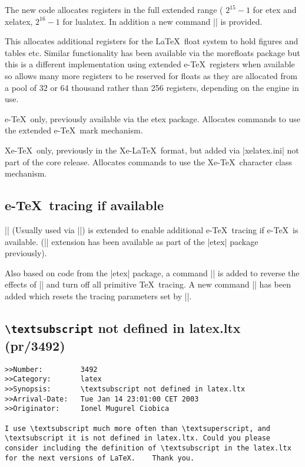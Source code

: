 \documentclass{ltxguide}
\newcommand\Lpack[1]{\mbox{\textsf{#1}}}
\newcommand\DescribeMacro[1]{\texttt{\string#1}}
\begin{document}
The new code allocates registers in the full extended range (
$2^{15}-1$ for etex and xelatex, $2^{16}-1$ for lualatex.
In addition a new command |\extrafloats| is provided.

\DescribeMacro{\extrafloats}
\smallskip

This allocates additional registers for the \LaTeX\ float system to
hold figures and tables etc. Similar functionality has been
available via the \Lpack{morefloats} package but this is a different
implementation using extended e-\TeX\ registers when available so
allows many more registers to be reserved for floats as they are
allocated from a pool of 32 or 64 thousand rather than 256 registers,
depending on the engine in use.

\DescribeMacro{\newmarks}
\smallskip

e-\TeX\ only, previously available via the \Lpack{etex} package.
Allocates commands to use the extended  e-\TeX\ mark mechanism.

\DescribeMacro{\newXeTeXintercharclass}
\smallskip

Xe-\TeX\ only, previously in the Xe-\LaTeX\ format, but added via
|xelatex.ini| not part of the core release. 
Allocates commands to use the Xe-\TeX\ character class mechanism.


\subsection{e-\TeX\ tracing if available}
|\loggingall| (Usually used via |\tracingall|) is extended to enable
additional e-\TeX\ tracing if e-\TeX\ is available. (|\tracingall|
extension has been available as part of the |etex| package previously).

Also based on code from the |etex| package, a command |\tracingnone|
is added to reverse the effects of |\tracingall| and turn off all primitive
\TeX\ tracing. A new command |\hideoutput| has been  added which resets the
tracing parameters set by |\showoutput|.




\subsection{\texttt{\textbackslash textsubscript} not defined in
   latex.ltx (pr/3492)}

\begin{verbatim}
>>Number:         3492
>>Category:       latex
>>Synopsis:       \textsubscript not defined in latex.ltx
>>Arrival-Date:   Tue Jan 14 23:01:00 CET 2003
>>Originator:     Ionel Mugurel Ciobica

I use \textsubscript much more often than \textsuperscript, and
\textsubscript it is not defined in latex.ltx. Could you please
consider including the definition of \textsubscript in the latex.ltx
for the next versions of LaTeX.    Thank you.
\end{verbatim}
\end{document}
